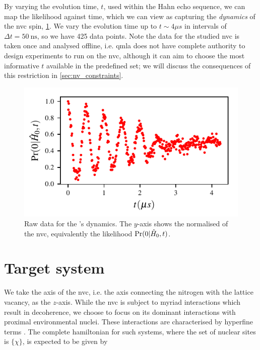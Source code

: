 \par 

By varying the evolution time, $t$, used within the Hahn echo sequence, we can map the \gls{likelihood} against time, 
    which we can view as capturing the \emph{dynamics} of the \gls{nvc} spin, \cref{fig:nv_raw_data}.
We vary the evolution time up to $t \sim 4 \mu s$ in intervals of $\Delta t = 50 \SI{}{\nano\second}$, 
    so we have 425 data points. 
Note the data for the studied \gls{nvc} is taken once and analysed offline, 
    i.e. \gls{qmla} does not have complete authority to design \glspl{experiment} 
    to run on the \gls{nvc}, although it can aim to choose the most informative $t$ 
    available in the predefined set; we will discuss the consequences of this restriction 
    in \cref{sec:nv_constraints}. 

\begin{figure}[t]
    \begin{center}
        \includegraphics{experimental_study/figures/raw_data.pdf}
    \end{center}
    \caption[Raw data for nitrogen-vacancy centre's dynamics]{
        Raw data for the 's dynamics.
        The $y$-axis shows the normalised  of the \gls{nvc}, 
        equivalently the \gls{likelihood} $\Pr(0 | \hat{H}_0, t)$. 
    }
    \label{fig:nv_raw_data}
\end{figure}



\section{Target system}\label{sec:target_system}
We take the axis of the \gls{nvc}, i.e. the axis connecting the \gls{nitrogen} with the 
    lattice vacancy, as the $z$-axis.
While the \gls{nvc} is subject to myriad interactions which result in decoherence,
    we choose to focus on its dominant interactions with proximal environmental nuclei. 
These interactions are characterised by hyperfine terms \cite{smeltzer201113c}.
The complete \gls{hamiltonian} for such systems, where the set of nuclear sites is $\{\chi\}$,
    is expected to be given by 

